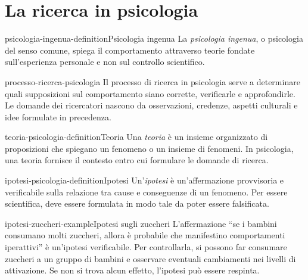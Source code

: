 \documentclass[preview]{standalone}
\begin{document}
\genpage

\section{La ricerca in psicologia}

\begin{snippetdefinition}{psicologia-ingenua-definition}{Psicologia ingenua}
    La \emph{psicologia ingenua}, o psicologia del senso comune, spiega il
    comportamento attraverso teorie fondate sull'esperienza personale e non sul
    controllo scientifico.
\end{snippetdefinition}

\begin{snippet}{processo-ricerca-psicologia}
    Il processo di ricerca in psicologia serve a determinare quali supposizioni
    sul comportamento siano corrette, verificarle e approfondirle. Le domande
    dei ricercatori nascono da osservazioni, credenze, aspetti culturali e
    idee formulate in precedenza.
\end{snippet}


\begin{snippetdefinition}{teoria-psicologia-definition}{Teoria}
    Una \emph{teoria} è un insieme organizzato di proposizioni che spiegano un
    fenomeno o un insieme di fenomeni. In psicologia, una teoria fornisce il
    contesto entro cui formulare le domande di ricerca.
\end{snippetdefinition}

\begin{snippetdefinition}{ipotesi-psicologia-definition}{Ipotesi}
    Un'\emph{ipotesi} è un'affermazione provvisoria e verificabile sulla
    relazione tra cause e conseguenze di un fenomeno. Per essere scientifica,
    deve essere formulata in modo tale da poter essere falsificata.
\end{snippetdefinition}

\begin{snippetexample}{ipotesi-zuccheri-example}{Ipotesi sugli zuccheri}
    L'affermazione ``se i bambini consumano molti zuccheri, allora è probabile
    che manifestino comportamenti iperattivi'' è un'ipotesi verificabile. Per
    controllarla, si possono far consumare zuccheri a un gruppo di bambini e
    osservare eventuali cambiamenti nei livelli di attivazione. Se non si
    trova alcun effetto, l'ipotesi può essere respinta.
\end{snippetexample}
\end{document}
